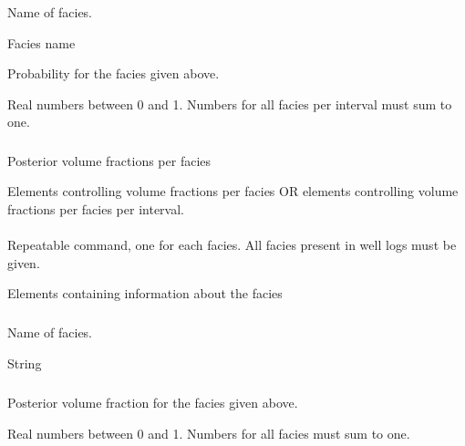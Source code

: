 {
 \slist
   \item \Description Name of facies.
   \item \Argument Facies name
   \item \Default
 \elist

 \slist
   \item \Description Probability for the facies given above.
   \item \Argument Real numbers between 0 and 1. Numbers for all facies per interval must sum to one.
   \item \Default
 \elist

\subsubsection{}
 \slist
   \item \Description Posterior volume fractions per facies
   \item \Argument Elements controlling volume fractions per facies OR elements controlling volume fractions per facies per interval.
   \item \Default
 \elist

\paragraph{}
 \slist
   \item \Description Repeatable command, one for each facies. All facies present in well logs must be given.
   \item \Argument Elements containing information about the facies
   \item \Default
 \elist

\subparagraph{}
 \slist
   \item \Description Name of facies.
   \item \Argument String
   \item \Default
 \elist

\subparagraph{}
 \slist
   \item \Description Posterior volume fraction for the facies given above.
   \item \Argument Real numbers between 0 and 1. Numbers for all facies must sum to one.
   \item \Default
 \elist

}
